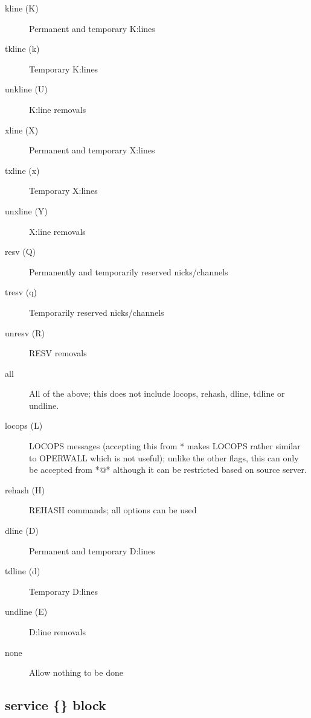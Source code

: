 \noindent
\begin{description}
\item[{kline (K)}]
	Permanent and temporary K:lines

\item[{tkline (k)}]
	Temporary K:lines

\item[{unkline (U)}]
	K:line removals

\item[{xline (X)}]
	Permanent and temporary X:lines

\item[{txline (x)}]
	Temporary X:lines

\item[{unxline (Y)}]
	X:line removals

\item[{resv (Q)}]
	Permanently and temporarily reserved nicks/channels

\item[{tresv (q)}]
	Temporarily reserved nicks/channels

\item[{unresv (R)}]
	RESV removals

\item[{all}]
	All of the above; this does not include locops, rehash, dline, tdline or undline.

\item[{locops (L)}]
	LOCOPS messages (accepting this from * makes LOCOPS rather
	similar to OPERWALL which is not useful); unlike the other flags,
	this can only be accepted from *@* although it can be
	restricted based on source server.

\item[{rehash (H)}]
	REHASH commands; all options can be used

\item[{dline (D)}]
	Permanent and temporary D:lines

\item[{tdline (d)}]
	Temporary D:lines

\item[{undline (E)}]
	D:line removals

\item[{none}]
	Allow nothing to be done
\end{description}

\subsection{service \{\} block}

